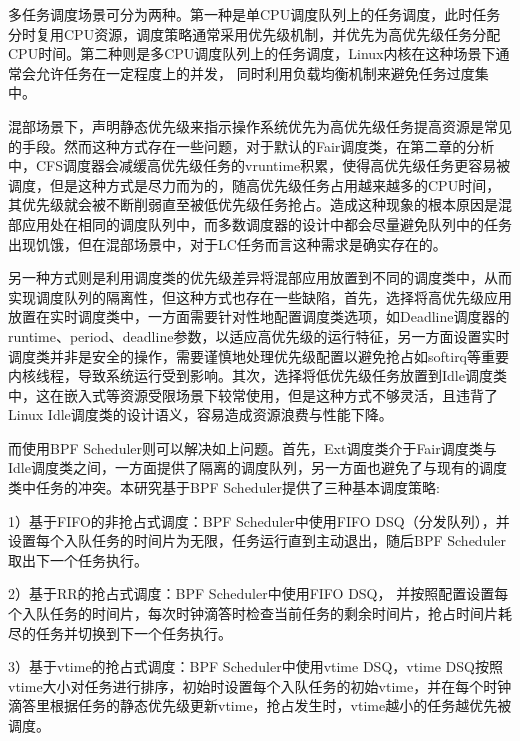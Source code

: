 
多任务调度场景可分为两种。第一种是单CPU调度队列上的任务调度，此时任务分时复用CPU资源，调度策略通常采用优先级机制，并优先为高优先级任务分配CPU时间。第二种则是多CPU调度队列上的任务调度，Linux内核在这种场景下通常会允许任务在一定程度上的并发， 同时利用负载均衡机制来避免任务过度集中。

混部场景下，声明静态优先级来指示操作系统优先为高优先级任务提高资源是常见的手段。然而这种方式存在一些问题，对于默认的Fair调度类，在第二章的分析中，CFS调度器会减缓高优先级任务的vruntime积累，使得高优先级任务更容易被调度，但是这种方式是尽力而为的，随高优先级任务占用越来越多的CPU时间，其优先级就会被不断削弱直至被低优先级任务抢占。造成这种现象的根本原因是混部应用处在相同的调度队列中，而多数调度器的设计中都会尽量避免队列中的任务出现饥饿，但在混部场景中，对于LC任务而言这种需求是确实存在的。

另一种方式则是利用调度类的优先级差异将混部应用放置到不同的调度类中，从而实现调度队列的隔离性，但这种方式也存在一些缺陷，首先，选择将高优先级应用放置在实时调度类中，一方面需要针对性地配置调度类选项，如Deadline调度器的runtime、period、deadline参数，以适应高优先级的运行特征，另一方面设置实时调度类并非是安全的操作，需要谨慎地处理优先级配置以避免抢占如softirq等重要内核线程，导致系统运行受到影响。其次，选择将低优先级任务放置到Idle调度类中，这在嵌入式等资源受限场景下较常使用，但是这种方式不够灵活，且违背了Linux Idle调度类的设计语义，容易造成资源浪费与性能下降。

而使用BPF Scheduler则可以解决如上问题。首先，Ext调度类介于Fair调度类与Idle调度类之间，一方面提供了隔离的调度队列，另一方面也避免了与现有的调度类中任务的冲突。本研究基于BPF Scheduler提供了三种基本调度策略:

1）基于FIFO的非抢占式调度：BPF Scheduler中使用FIFO DSQ（分发队列），并设置每个入队任务的时间片为无限，任务运行直到主动退出，随后BPF Scheduler取出下一个任务执行。

2）基于RR的抢占式调度：BPF Scheduler中使用FIFO DSQ， 并按照配置设置每个入队任务的时间片，每次时钟滴答时检查当前任务的剩余时间片，抢占时间片耗尽的任务并切换到下一个任务执行。

3）基于vtime的抢占式调度：BPF Scheduler中使用vtime DSQ，vtime DSQ按照vtime大小对任务进行排序，初始时设置每个入队任务的初始vtime，并在每个时钟滴答里根据任务的静态优先级更新vtime，抢占发生时，vtime越小的任务越优先被调度。

